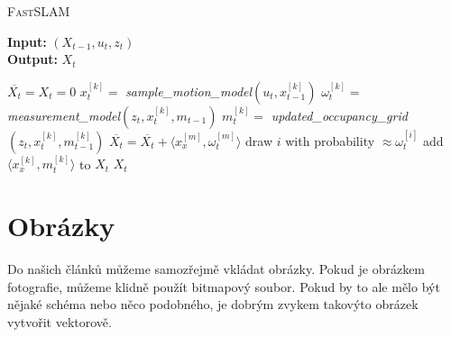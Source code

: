 \documentclass[a4paper,11pt]{article}
\begin{document}
\begin{algorithm}
\caption{\textsc{FastSLAM}}
\label{alg1}
\textbf{Input:} $(X_{t-1},u_t,z_t)$ \\
\textbf{Output:} $X_t$
\medskip
{}
\begin{algorithmic}[1]
\STATE $\overline{X_t} = X_t = 0$
\STATE $x_t^{[k]} = $ \textit{sample\_motion\_model}$(u_t,x_{t-1}^{[k]})$
\STATE $\omega _t^{[k]} = $ \textit{measurement\_model}$(z_t,x_t^{[k]},m_{t-1})$
\STATE $m_t^{[k]} = $ \textit{updated\_occupancy\_grid}$(z_t,x_t^{[k]},m_{t-1}^{[k]})$
\STATE $\overline{X_t} = \overline{X_t} + \langle x_x^{[m]},\omega _t^{[m]} \rangle$
\ENDFOR
{}
\STATE draw $i$ with probability $\approx \omega _t^{[i]}$
\STATE add $\langle x_x^{[k]},m_t^{[k]} \rangle$ to $X_t$
\ENDFOR
\RETURN $X_t$
\end{algorithmic}
\end{algorithm}

\section{Obrázky}
Do našich článků můžeme samozřejmě vkládat obrázky. Pokud je obrázkem fotografie, můžeme klidně použít bitmapový soubor. Pokud by to ale mělo být nějaké schéma nebo něco podobného, je dobrým zvykem takovýto obrázek vytvořit vektorově.
\end{document}

